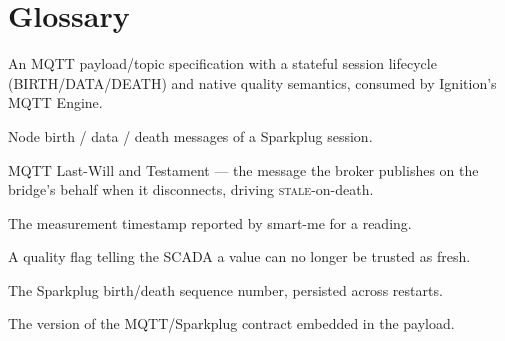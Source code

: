 \chapter{Glossary}
\label{app:glossary}

\begin{description}[style=nextline, leftmargin=0pt]
  \item[Sparkplug~B] An MQTT payload/topic specification with a stateful session lifecycle
        (BIRTH/DATA/DEATH) and native quality semantics, consumed by Ignition's MQTT Engine.
  \item[NBIRTH / NDATA / NDEATH] Node birth / data / death messages of a Sparkplug session.
  \item[LWT] MQTT Last-Will and Testament — the message the broker publishes on the
        bridge's behalf when it disconnects, driving \textsc{stale}-on-death.
  \item[\texttt{ValueDate}] The measurement timestamp reported by smart-me for a reading.
  \item[STALE] A quality flag telling the SCADA a value can no longer be trusted as fresh.
  \item[\texttt{bdSeq}] The Sparkplug birth/death sequence number, persisted across restarts.
  \item[CONTRACT\_VERSION] The version of the MQTT/Sparkplug contract embedded in the payload.
\end{description}

